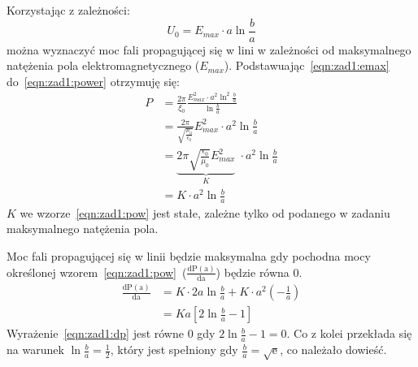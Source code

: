 \documentclass[rep.tex]{subfiles}
\begin{document}
Korzystając z zależności:
\begin{equation}
  U_0 = E_{max}\cdot a \ln\frac{b}{a} \label{eqn:zad1:emax}
\end{equation}
można wyznaczyć moc fali propagującej się w lini w zależności od maksymalnego natężenia pola elektromagnetycznego ($E_{max}$).
Podstawuając~\ref{eqn:zad1:emax} do~\ref{eqn:zad1:power} otrzymuję się:
\begin{align}
  P &= \frac{2\pi}{\xi_0}\frac{E_{max}^2 \cdot a^2 \ln^2\frac{b}{a}}{\ln\frac{b}{a}} \nonumber \\
    &= \frac{2\pi}{\sqrt{\frac{\mu_0}{\epsilon_0}}}E_{max}^2 \cdot a^2 \ln\frac{b}{a} \nonumber \\
    &= \underbrace{2\pi\sqrt{\frac{\epsilon_0}{\mu_0}}E_{max}^2}_K \; \cdot a^2 \ln\frac{b}{a} \nonumber \\
    &= K \cdot a^2 \ln\frac{b}{a} \label{eqn:zad1:pow}
\end{align}
$K$ we wzorze~\ref{eqn:zad1:pow} jest stałe, zależne tylko od podanego w zadaniu maksymalnego natężenia pola.

Moc fali propagującej się w linii będzie maksymalna gdy pochodna mocy określonej wzorem~\ref{eqn:zad1:pow}~($\frac{\mathrm{dP(a)}}{\mathrm{da}}$)
będzie równa $0$.
\begin{align}
  \frac{\mathrm{dP(a)}}{\mathrm{da}} &= K \cdot 2a\ln\frac{b}{a} + K \cdot a^2(-\frac{1}{a}) \nonumber \\
    &= Ka[2\ln\frac{b}{a} - 1] \label{eqn:zad1:dp}
\end{align}
Wyrażenie~\ref{eqn:zad1:dp} jest równe $0$ gdy $2\ln\frac{b}{a} - 1 = 0$.
Co z kolei przekłada się na warunek $\ln\frac{b}{a} = \frac{1}{2}$, który jest spełniony gdy $\frac{b}{a} = \sqrt{\mathrm{e}}$,
co należało dowieść.
\end{document}
